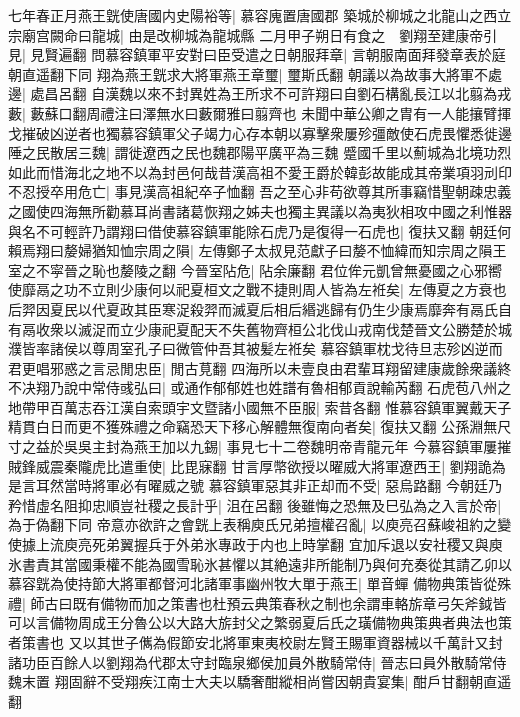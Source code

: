 七年春正月燕王皝使唐國内史陽裕等|{
	慕容廆置唐國郡}
築城於柳城之北龍山之西立宗廟宫闕命曰龍城|{
	由是改柳城為龍城縣}
二月甲子朔日有食之　劉翔至建康帝引見|{
	見賢遍翻}
問慕容鎮軍平安對曰臣受遣之日朝服拜章|{
	言朝服南面拜發章表於庭朝直遥翻下同}
翔為燕王皝求大將軍燕王章璽|{
	璽斯氏翻}
朝議以為故事大將軍不處邊|{
	處昌呂翻}
自漢魏以來不封異姓為王所求不可許翔曰自劉石構亂長江以北翦為戎藪|{
	藪蘇口翻周禮注曰澤無水曰藪爾雅曰翦齊也}
未聞中華公卿之胄有一人能攘臂揮戈摧破凶逆者也獨慕容鎮軍父子竭力心存本朝以寡擊衆屢殄彊敵使石虎畏懼悉徙邊陲之民散居三魏|{
	謂徙遼西之民也魏郡陽平廣平為三魏}
蹙國千里以薊城為北境功烈如此而惜海北之地不以為封邑何哉昔漢高祖不愛王爵於韓彭故能成其帝業項羽刓印不忍授卒用危亡|{
	事見漢高祖紀卒子恤翻}
吾之至心非苟欲尊其所事竊惜聖朝疎忠義之國使四海無所勸慕耳尚書諸葛恢翔之姊夫也獨主異議以為夷狄相攻中國之利惟器與名不可輕許乃謂翔曰借使慕容鎮軍能除石虎乃是復得一石虎也|{
	復扶又翻}
朝廷何賴焉翔曰嫠婦猶知恤宗周之隕|{
	左傳鄭子太叔見范獻子曰嫠不恤緯而知宗周之隕王室之不寜晉之恥也嫠陵之翻}
今晉室阽危|{
	阽余廉翻}
君位侔元凱曾無憂國之心邪嚮使靡鬲之功不立則少康何以祀夏桓文之戰不捷則周人皆為左袵矣|{
	左傳夏之方衰也后羿因夏民以代夏政其臣寒浞殺羿而滅夏后相后緡逃歸有仍生少康焉靡奔有鬲氏自有鬲收衆以滅浞而立少康祀夏配天不失舊物齊桓公北伐山戎南伐楚晉文公勝楚於城濮皆率諸侯以尊周室孔子曰微管仲吾其被髪左袵矣}
慕容鎮軍枕戈待旦志殄凶逆而君更唱邪惑之言忌閒忠臣|{
	閒古莧翻}
四海所以未壹良由君輩耳翔留建康歲餘衆議終不决翔乃說中常侍彧弘曰|{
	或通作郁郁姓也姓譜有魯相郁貢說輸芮翻}
石虎苞八州之地帶甲百萬志吞江漢自索頭宇文暨諸小國無不臣服|{
	索昔各翻}
惟慕容鎮軍翼戴天子精貫白日而更不獲殊禮之命竊恐天下移心解體無復南向者矣|{
	復扶又翻}
公孫淵無尺寸之益於吳吳主封為燕王加以九錫|{
	事見七十二卷魏明帝青龍元年}
今慕容鎮軍屢摧賊鋒威震秦隴虎比遣重使|{
	比毘寐翻}
甘言厚幣欲授以曜威大將軍遼西王|{
	劉翔詭為是言耳然當時將軍必有曜威之號}
慕容鎮軍惡其非正却而不受|{
	惡烏路翻}
今朝廷乃矜惜虛名阻抑忠順豈社稷之長計乎|{
	沮在呂翻}
後雖悔之恐無及巳弘為之入言於帝|{
	為于偽翻下同}
帝意亦欲許之會皝上表稱庾氏兄弟擅權召亂|{
	以庾亮召蘇峻祖約之變使據上流庾亮死弟翼握兵于外弟氷專政于内也上時掌翻}
宜加斥退以安社稷又與庾氷書責其當國秉權不能為國雪恥氷甚懼以其絶遠非所能制乃與何充奏從其請乙卯以慕容皝為使持節大將軍都督河北諸軍事幽州牧大單于燕王|{
	單音蟬}
備物典策皆從殊禮|{
	師古曰既有備物而加之策書也杜預云典策春秋之制也余謂車輅旂章弓矢斧鉞皆可以言備物周成王分魯公以大路大旂封父之繁弱夏后氏之璜備物典策典者典法也策者策書也}
又以其世子㒞為假節安北將軍東夷校尉左賢王賜軍資器械以千萬計又封諸功臣百餘人以劉翔為代郡太守封臨泉鄉侯加員外散騎常侍|{
	晉志曰員外散騎常侍魏末置}
翔固辭不受翔疾江南士大夫以驕奢酣縱相尚嘗因朝貴宴集|{
	酣戶甘翻朝直遥翻}
